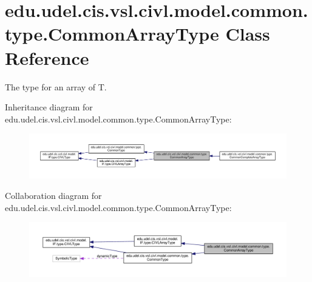 \hypertarget{classedu_1_1udel_1_1cis_1_1vsl_1_1civl_1_1model_1_1common_1_1type_1_1CommonArrayType}{}\section{edu.\+udel.\+cis.\+vsl.\+civl.\+model.\+common.\+type.\+Common\+Array\+Type Class Reference}
\label{classedu_1_1udel_1_1cis_1_1vsl_1_1civl_1_1model_1_1common_1_1type_1_1CommonArrayType}


The type for an array of T.  




Inheritance diagram for edu.\+udel.\+cis.\+vsl.\+civl.\+model.\+common.\+type.\+Common\+Array\+Type\+:
\nopagebreak
\begin{figure}[H]
\begin{center}
\leavevmode
\includegraphics[width=350pt]{classedu_1_1udel_1_1cis_1_1vsl_1_1civl_1_1model_1_1common_1_1type_1_1CommonArrayType__inherit__graph}
\end{center}
\end{figure}


Collaboration diagram for edu.\+udel.\+cis.\+vsl.\+civl.\+model.\+common.\+type.\+Common\+Array\+Type\+:
\nopagebreak
\begin{figure}[H]
\begin{center}
\leavevmode
\includegraphics[width=350pt]{classedu_1_1udel_1_1cis_1_1vsl_1_1civl_1_1model_1_1common_1_1type_1_1CommonArrayType__coll__graph}
\end{center}
\end{figure}
